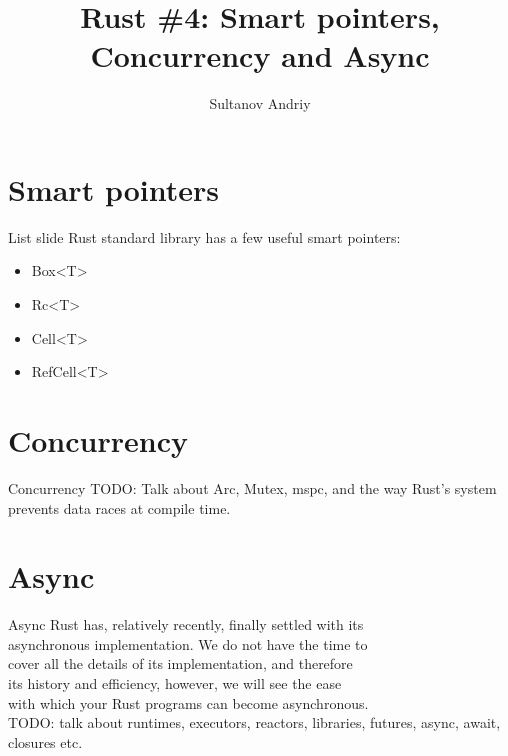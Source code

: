 \documentclass[usenames,dvipsnames,10pt,aspectratio=169]{beamer}
\title[Rust \#4]{Rust \#4: Smart pointers,\\ \vspace{0.1cm}Concurrency and Async}
\author[Sultanov Andriy]{Sultanov Andriy}
\institute{APPS@UCU}
\begin{document}
\begin{frame}
\titlepage
\end{frame}

\begin{frame}{\contentsname}
\tableofcontents
\end{frame}


\section{Smart pointers}

\begin{frame}{List slide}
\large	
Rust standard library has a few useful smart pointers:
\vspace{0.4cm}
\begin{itemize}[label=$\bullet$]
	\item Box<T>
	\item Rc<T>
	\item Cell<T>
	\item RefCell<T>
\end{itemize}
\end{frame}



\section{Concurrency}

\begin{frame}{Concurrency}
	\large
	\textcolor{ucured}{TODO: Talk about Arc, Mutex,
	mspc, and the way Rust's system prevents data races at compile
time.}
\end{frame}


\section{Async}

\begin{frame}{Async}
	\large
	Rust has, relatively recently, finally settled with its\\
	asynchronous implementation. We do not have the time to\\
	cover all the details of its implementation, and therefore\\
	its history and efficiency, however, we will see the ease\\
	with which your Rust programs can become asynchronous.\\
	\textcolor{ucured}{TODO: talk about runtimes, executors,
	reactors, libraries, futures, async, await, closures etc.}
	
\end{frame}
\end{document}
